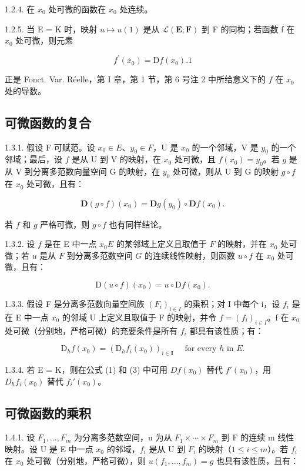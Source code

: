 1.2.4. 在 \(x_0\) 处可微的函数在 \(x_0\) 处连续。

1.2.5. 当 E = K 时，映射 \(u \mapsto u(1)\) 是从 \(\mathcal{L}(\mathbf{E}; \mathbf{F})\) 到 F 的同构；若函数 f 在 \(x_{0}\) 处可微，则元素

\[
f ^ {\prime} (x _ {0}) = \mathrm{D} f (x _ {0}). 1
\]

正是 Fonct. Var. Réelle，第 I 章，第 1 节，第 6 号注 2 中所给意义下的 \(f\) 在 \(x_0\) 处的导数。

\subsection{可微函数的复合}

1.3.1. 假设 F 可赋范。设 \(x_0 \in E\)、\(y_0 \in F\)，U 是 \(x_0\) 的一个邻域，V 是 \(y_0\) 的一个邻域；最后，设 \(f\) 是从 U 到 V 的映射，在 \(x_0\) 处可微，且 \(f(x_0) = y_0\)。若 \(g\) 是从 V 到分离多范数向量空间 G 的映射，在 \(y_0\) 处可微，则从 U 到 G 的映射 \(g \circ f\) 在 \(x_0\) 处可微，且有：

\[
\mathbf {D} (g \circ f) (x _ {0}) = \mathbf {D} g (y _ {0}) \circ \mathbf {D} f (x _ {0}).\tag{1}
\]

若 \(f\) 和 \(g\) 严格可微，则 \(g \circ f\) 也有同样结论。

1.3.2. 设 \(f\) 是在 E 中一点 \(x_0\)\(E\) 的某邻域上定义且取值于 \(F\) 的映射，并在 \(x_0\) 处可微；若 \(u\) 是从 \(F\) 到分离多范数空间 \(G\) 的连续线性映射，则函数 \(u \circ f\) 在 \(x_0\) 处可微，且有：

\[
\mathrm{D} (u \circ f) (x _ {0}) = u \circ \mathrm{D} f (x _ {0}).\tag{2}
\]

1.3.3. 假设 F 是分离多范数向量空间族 \((F_{i})_{i\in I}\) 的乘积；对 I 中每个 i，设 \(f_{i}\) 是在 E 中一点 \(x_{0}\) 的邻域 U 上定义且取值于 F 的映射，并令 \(f = (f_{i})_{i\in I}\)。f 在 \(x_{0}\) 处可微（分别地，严格可微）的充要条件是所有 \(f_{i}\) 都具有该性质；有：

\[
\mathrm{D} _ {h} f (x _ {0}) = (\mathrm{D} _ {h} f _ {i} (x _ {0})) _ {i \in \mathbf {I}} \quad \text { for   every } h \text { in } E.\tag{3}
\]

1.3.4. 若 E = K，则在公式 (1) 和 (3) 中可用 \(Df(x_{0})\) 替代 \(f'(x_{0})\)，用 \(D_{h}f_{i}(x_{0})\) 替代 \(f_{i}'(x_{0})\)。

\subsection{可微函数的乘积}

1.4.1. 设 \(F_{1}, \ldots, F_{m}\) 为分离多范数空间，u 为从 \(F_{1} \times \cdots \times F_{m}\) 到 F 的连续 m 线性映射。设 U 是 E 中一点 \(x_{0}\) 的邻域，\(f_{i}\) 是从 U 到 \(F_{i}\) 的映射（\(1 \leqslant i \leqslant m\)）。若 \(f_{i}\) 在 \(x_{0}\) 处可微（分别地，严格可微），则 \(u(f_{1}, \ldots, f_{m}) = g\) 也具有该性质，且有：

